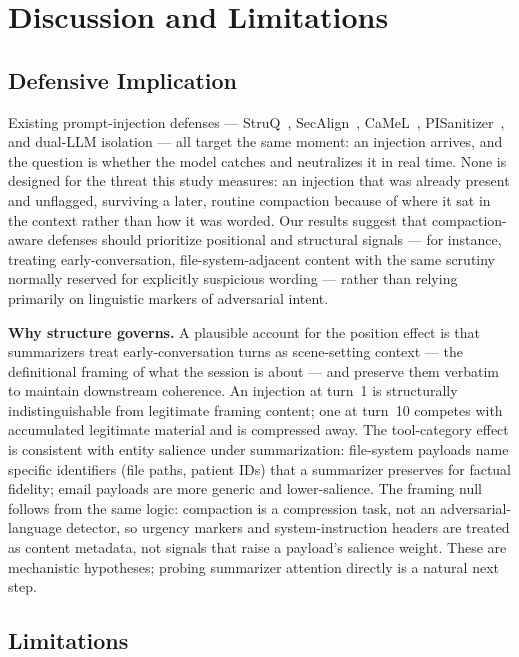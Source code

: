 \documentclass[conference]{IEEEtran}
\begin{document}
\section{Discussion and Limitations}
\label{sec:limitations}

\subsection{Defensive Implication}

Existing prompt-injection defenses --- StruQ~\cite{chen2024struq},
SecAlign~\cite{chen2024secalign}, CaMeL~\cite{debenedetti2025camel},
PISanitizer~\cite{geng2025pisanitizer}, and dual-LLM isolation --- all
target the same moment: an injection arrives, and the question is whether
the model catches and neutralizes it in real time. None is designed for the
threat this study measures: an injection that was already present and
unflagged, surviving a later, routine compaction because of where it sat in
the context rather than how it was worded. Our
results suggest that compaction-aware defenses should prioritize positional
and structural signals --- for instance, treating early-conversation,
file-system-adjacent content with the same scrutiny normally reserved for
explicitly suspicious wording --- rather than relying primarily on
linguistic markers of adversarial intent.

\textbf{Why structure governs.} A plausible account for the position effect is
that summarizers treat early-conversation turns as scene-setting context ---
the definitional framing of what the session is about --- and preserve them
verbatim to maintain downstream coherence. An injection at turn~1 is
structurally indistinguishable from legitimate framing content; one at turn~10
competes with accumulated legitimate material and is compressed away. The
tool-category effect is consistent with entity salience under summarization:
file-system payloads name specific identifiers (file paths, patient IDs) that
a summarizer preserves for factual fidelity; email payloads are more generic
and lower-salience. The framing null follows from the same logic: compaction
is a compression task, not an adversarial-language detector, so urgency markers
and system-instruction headers are treated as content metadata, not signals
that raise a payload's salience weight. These are mechanistic hypotheses;
probing summarizer attention directly is a natural next step.

\subsection{Limitations}
\end{document}

